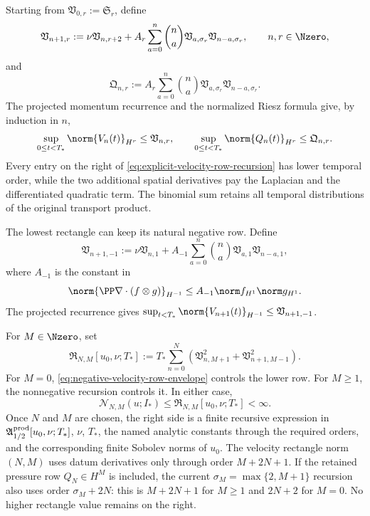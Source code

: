 Starting from \(\mathfrak V_{0,r}:=\mathfrak S_r\), define
\begin{equation}
 \mathfrak V_{n+1,r}
 :=\nu\mathfrak V_{n,r+2}
 +A_r\sum_{a=0}^{n}\binom na
 \mathfrak V_{a,\sigma_r}\mathfrak V_{n-a,\sigma_r},
 \qquad n,r\in\Nzero,
 \label{eq:explicit-velocity-row-recursion}
\end{equation}
and
\begin{equation}
 \mathfrak Q_{n,r}
 :=A_r\sum_{a=0}^{n}\binom na
 \mathfrak V_{a,\sigma_r}\mathfrak V_{n-a,\sigma_r}.
 \label{eq:explicit-pressure-row-recursion}
\end{equation}
The projected momentum recurrence and the normalized Riesz formula give, by
induction in \(n\),
\begin{equation}
 \sup_{0\le t<T_*}\norm{V_n(t)}_{H^r}
 \le\mathfrak V_{n,r},
 \qquad
 \sup_{0\le t<T_*}\norm{Q_n(t)}_{H^r}
 \le\mathfrak Q_{n,r}.
 \label{eq:explicit-jet-row-bounds}
\end{equation}
Every entry on the right of \eqref{eq:explicit-velocity-row-recursion} has
lower temporal order, while the two additional spatial derivatives pay the
Laplacian and the differentiated quadratic term.  The binomial sum retains
all temporal distributions of the original transport product.

The lowest rectangle can keep its natural negative row.  Define
\begin{equation}
 \mathfrak V_{n+1,-1}
 :=\nu\mathfrak V_{n,1}
 +A_{-1}\sum_{a=0}^{n}\binom na
 \mathfrak V_{a,1}\mathfrak V_{n-a,1},
 \label{eq:negative-velocity-row-envelope}
\end{equation}
where \(A_{-1}\) is the constant in
\[
 \norm{\PP\nabla\cdot(f\otimes g)}_{H^{-1}}
 \le A_{-1}\norm f_{H^1}\norm g_{H^1}.
\]
The projected recurrence gives
\(\sup_{t<T_*}\norm{V_{n+1}(t)}_{H^{-1}}
\le\mathfrak V_{n+1,-1}\).

For \(M\in\Nzero\), set
\begin{equation}
 \mathfrak R_{N,M}[u_0,\nu;T_*]
 :=T_*\sum_{n=0}^{N}\left(
  \mathfrak V_{n,M+1}^2
  +\mathfrak V_{n+1,M-1}^2
 \right).
 \label{eq:explicit-rectangle-envelope}
\end{equation}
For \(M=0\), \eqref{eq:negative-velocity-row-envelope} controls the lower
row.  For \(M\ge1\), the nonnegative recursion controls it.  In either case,
\begin{equation}
 \mathcal N_{N,M}(u;I_*)
 \le\mathfrak R_{N,M}[u_0,\nu;T_*]<\infty.
 \label{eq:closed-rectangle-estimate}
\end{equation}
Once \(N\) and \(M\) are chosen, the right side is a finite recursive
expression in \(\mathfrak A_{1/2}^{\rm prod}[u_0,\nu;T_*]\), \(\nu\), \(T_*\), the named
analytic constants through the required orders, and the corresponding finite
Sobolev norms of \(u_0\).  The velocity rectangle norm \((N,M)\) uses datum
derivatives only through order \(M+2N+1\).  If the retained pressure row
\(Q_N\in H^M\) is included, the current
\(\sigma_M=\max\{2,M+1\}\) recursion also uses order
\(\sigma_M+2N\): this is \(M+2N+1\) for \(M\ge1\) and \(2N+2\) for
\(M=0\).  No higher rectangle value remains on the right.

